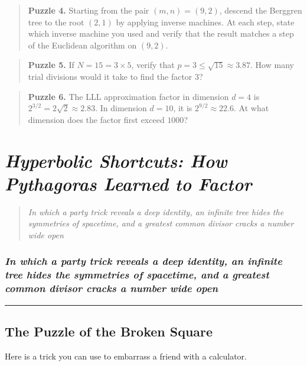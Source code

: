 \documentclass[11pt,openany]{book}
\theoremstyle{definition}
\theoremstyle{plain}
\theoremstyle{remark}
\begin{document}
\begin{quote}
\textbf{Puzzle 4.} Starting from the pair $(m, n) = (9, 2)$, descend the Berggren tree to the root $(2, 1)$ by applying inverse machines. At each step, state which inverse machine you used and verify that the result matches a step of the Euclidean algorithm on $(9, 2)$.
\end{quote}


\begin{quote}
\textbf{Puzzle 5.} If $N = 15 = 3 \times 5$, verify that $p = 3 \le \sqrt{15} \approx 3.87$. How many trial divisions would it take to find the factor $3$?
\end{quote}


\begin{quote}
\textbf{Puzzle 6.} The LLL approximation factor in dimension $d = 4$ is $2^{3/2} = 2\sqrt{2} \approx 2.83$. In dimension $d = 10$, it is $2^{9/2} \approx 22.6$. At what dimension does the factor first exceed $1000$?
\end{quote}


\clearpage

\chapter{\textit{Hyperbolic Shortcuts: How Pythagoras Learned to Factor}}
\begin{quote}\textit{In which a party trick reveals a deep identity, an infinite tree hides the symmetries of spacetime, and a greatest common divisor cracks a number wide open}\end{quote}



\subsection*{\textit{In which a party trick reveals a deep identity, an infinite tree hides the symmetries of spacetime, and a greatest common divisor cracks a number wide open}}


\bigskip\noindent\rule{\textwidth}{0.4pt}\bigskip


\section*{The Puzzle of the Broken Square}


Here is a trick you can use to embarrass a friend with a calculator.
\end{document}
